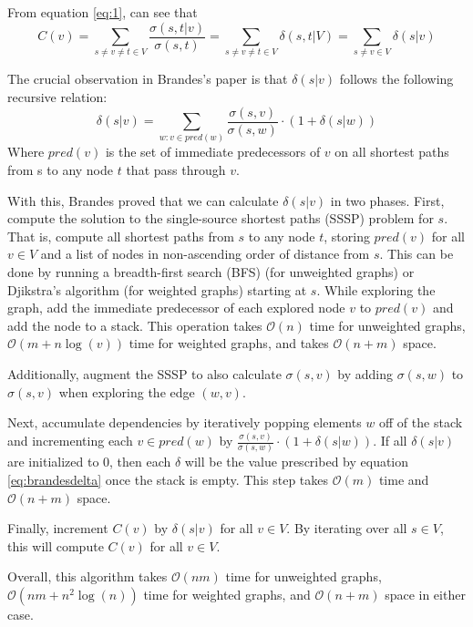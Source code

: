 \documentclass[12pt,a4paper,twoside,openright]{report}
\begin{document}
	From equation \ref{eq:1}, can see that\begin{equation}\label{eq:deltacentrality}
		C(v) = \sum_{s\neq v \neq t \in V} \frac{\sigma(s,t|v)}{\sigma(s,t)} =  \sum_{s\neq v \neq t \in V} \delta(s,t|V) = \sum_{s\neq v \in V} \delta(s|v)
	\end{equation}
	
	The crucial observation in Brandes's paper is that $\delta(s|v)$ follows the following recursive relation: \begin{equation}\label{eq:brandesdelta}
		\delta(s|v) = \sum_{w: v \in pred(w)} \frac{\sigma(s,v)}{\sigma(s,w)} \cdot (1+\delta(s|w))
	\end{equation} 
	Where $pred(v)$ is the set of immediate predecessors of $v$ on all shortest paths from s to any node $t$ that pass through $v$.
	
	With this, Brandes proved that we can calculate $\delta(s|v)$ in two phases. First, compute the solution to the single-source shortest paths (SSSP) problem for $s$. That is, compute all shortest paths from $s$ to any node $t$, storing $pred(v)$ for all $v \in V$ and a list of nodes in non-ascending order of distance from $s$. This can be done by running a breadth-first search (BFS) (for unweighted graphs) or Djikstra's algorithm (for weighted graphs) starting at $s$. While exploring the graph, add the immediate predecessor of each explored node $v$ to $pred(v)$ and add the node to a stack. This operation takes $\mathcal{O}(n)$ time for unweighted graphs, $\mathcal{O}(m+n\log(v))$ time for weighted graphs, and takes $\mathcal{O}(n+m)$ space.
	
	Additionally, augment the SSSP to also calculate $\sigma(s,v)$ by adding $\sigma(s,w)$ to $\sigma(s,v)$ when exploring the edge $(w,v)$.
	
	Next, accumulate dependencies by iteratively popping elements $w$ off of the stack and incrementing each $v \in pred(w)$ by $\frac{\sigma(s,v)}{\sigma(s,w)} \cdot (1+\delta(s|w))$. If all $\delta(s|v)$ are initialized to 0, then each $\delta$ will be the value prescribed by equation \ref{eq:brandesdelta} once the stack is empty. This step takes $\mathcal{O}(m)$ time and $\mathcal{O}(n+m)$ space.
	
	Finally, increment $C(v)$ by $\delta(s|v)$ for all $v \in V$. By iterating over all $s \in V$, this will compute $C(v)$ for all $v \in V$.
	
	Overall, this algorithm takes $\mathcal{O}(nm)$ time for unweighted graphs, $\mathcal{O}(nm+n^2 \log(n))$ time for weighted graphs, and $\mathcal{O}(n+m)$ space in either case.
	
\end{document}
